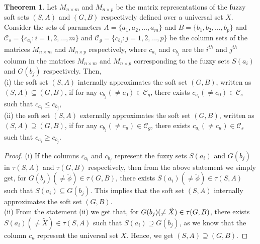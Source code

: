 \documentclass{article}
\theoremstyle{definition}
\newtheorem{theorem}{Theorem}[section]
\begin{document}
\begin{theorem}

     Let $M_{n\times m}$ and $M_{n\times p}$ be the matrix representations of the fuzzy soft sets $(S,A)$ and $(G,B)$ respectively defined over a universal set $X$. Consider the sets of parameters $A=\{a_1, a_2, \dots, a_m\}$ and $B=\{b_1, b_2, \dots, b_p\}$ and ${\mathcal{C}}_s=\{c_{a_i}: i=1, 2, \dots, m\}$ and ${\mathcal{C}}_g =\{c_{b_j}: j=1, 2, \dots, p\}$  be the column sets of the matrices $M_{n\times m}$ and $M_{n\times p}$ respectively, where $c_{a_i}$ and $c_{b_j}$ are the $i^{th}$ and $j^{th}$ column in the matrices $M_{n\times m}$ and $M_{n\times p}$ corresponding to the fuzzy sets $S(a_i)$ and $G(b_j)$ respectively. Then,\\
    
         
      
       (i) the soft set $(S,A)$ internally approximates the soft set $(G,B)$, written as $(S,A) \subseteq (G,B)$, if for any $c_{b_j} (\neq c_0) \in {\mathcal{C}}_g$, there exists $c_{a_i} (\neq c_0) \in {\mathcal{C}}_s$ such that $c_{a_i}\leq c_{b_j}$,\\

       (ii) the soft set $(S,A)$ externally approximates the soft set $(G,B)$, written as $(S,A) \supseteq (G,B)$, if for any $c_{b_j} (\neq c_u) \in {\mathcal{C}}_g$, there exists $c_{a_i} (\neq c_u) \in {\mathcal{C}}_s$ such that $c_{a_i}\geq c_{b_j}$.\\
       
\end{theorem}

\begin{proof}

(i) If the columns $c_{a_i}$ and $ c_{b_j}$ represent the fuzzy sets $S(a_i)$ and $G(b_j)$ in $\tau(S,A)$ and $\tau(G,B)$ respectively, then from the above statement we simply get, for $G(b_j) (\neq \tilde{\phi}) \in \tau(G,B)$, there exists $S(a_i) (\neq \tilde{\phi}) \in \tau(S,A)$ such that $S(a_i)\subseteq G(b_j)$. This implies that the soft set $(S,A)$ internally approximates the soft set $(G,B)$.\\

(ii) From the statement (ii) we get that, for $G(b_j) (\neq \Tilde{X}) \in \tau(G,B)$, there exists $S(a_i) (\neq \tilde{X}) \in \tau(S,A)$ such that $S(a_i)\supseteq G(b_j)$, as we know that the column $c_u$ represent the universal set $X$. Hence, we get $(S,A) \supseteq (G,B)$.
\end{proof}
\end{document}
